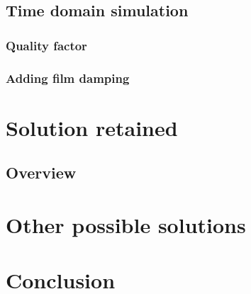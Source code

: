\subsection{Time domain simulation}
\subsubsection{Quality factor}
\subsubsection{Adding film damping}

\section{Solution retained}
\subsection{Overview}

\section{Other possible solutions}

\section{Conclusion}


\pagebreak



\pagebreak
\appendix



